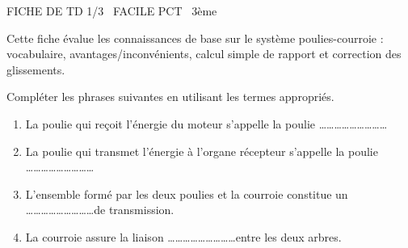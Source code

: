 \documentclass[11pt]{article}
\begin{document}
\begin{tcolorbox}[enhanced,colback=popink,colframe=popink,arc=10pt,boxrule=0pt,left=12pt,right=12pt,top=9pt,bottom=9pt]
{\color{white}\popxbold\small FICHE DE TD 1/3 \textbullet\ FACILE \hfill PCT \textbullet\ 3ème\par}
\end{tcolorbox}
\vspace{4pt}
Cette fiche évalue les connaissances de base sur le système poulies-courroie : vocabulaire, avantages/inconvénients, calcul simple de rapport et correction des glissements.

\begin{exercice}
Compléter les phrases suivantes en utilisant les termes appropriés.
\begin{enumerate}
    \item La poulie qui reçoit l'énergie du moteur s'appelle la poulie \ldots\ldots\ldots\ldots\ldots\ldots\ldots\ldots\ldots
    \item La poulie qui transmet l'énergie à l'organe récepteur s'appelle la poulie \ldots\ldots\ldots\ldots\ldots\ldots\ldots\ldots\ldots
    \item L'ensemble formé par les deux poulies et la courroie constitue un \ldots\ldots\ldots\ldots\ldots\ldots\ldots\ldots\ldots de transmission.
    \item La courroie assure la liaison \ldots\ldots\ldots\ldots\ldots\ldots\ldots\ldots\ldots entre les deux arbres.
\end{enumerate}
\end{exercice}
\end{document}
